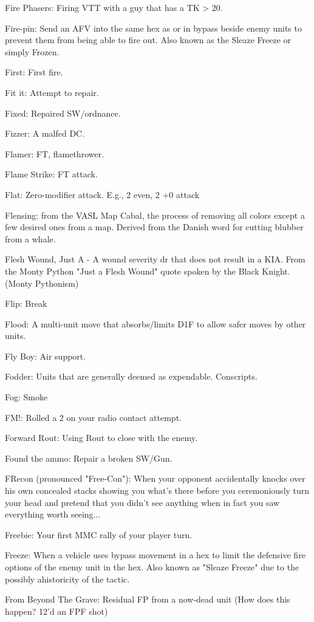 \documentclass[letterpaper]{article}
\begin{document}
Fire Phasers: Firing VTT with a guy that has a TK > 20.

Fire-pin: Send an AFV into the same hex as or in bypass beside enemy units to prevent them from being able to fire out. Also known as the Sleaze Freeze or simply Frozen.

First: First fire.

Fit it: Attempt to repair.

Fixed: Repaired SW/ordnance.

Fizzer: A malfed DC.

Flamer: FT, flamethrower.

Flame Strike: FT attack.

Flat: Zero-modifier attack. E.g., 2 even, 2 +0 attack

Flensing: from the VASL Map Cabal, the process of removing all colors except a few desired ones from a map. Derived from the Danish word for cutting blubber from a whale.

Flesh Wound, Just A - A wound severity dr that does not result in a KIA. From the Monty Python "Just a Flesh Wound" quote spoken by the Black Knight. (Monty Pythonism)

Flip: Break

Flood: A multi-unit move that absorbs/limits D1F to allow safer moves by other units.

Fly Boy: Air support.

Fodder: Units that are generally deemed as expendable. Conscripts.

Fog: Smoke

FM!:  Rolled a 2 on your radio contact attempt.

Forward Rout: Using Rout to close with the enemy.

Found the ammo: Repair a broken SW/Gun.

FRecon (pronounced "Free-Con"): When your opponent accidentally knocks over his own concealed stacks showing you what's there before you ceremoniously turn your head and pretend that you didn't see anything when in fact you saw everything worth seeing...

Freebie:  Your first MMC rally of your player turn.

Freeze: When a vehicle uses bypass movement in a hex to limit the defensive fire options of the enemy unit in the hex. Also known as "Sleaze Freeze" due to the possibly ahistoricity of the tactic.

From Beyond The Grave:  Residual FP from a now-dead unit (How does this happen?  12'd an FPF shot)
\end{document}
